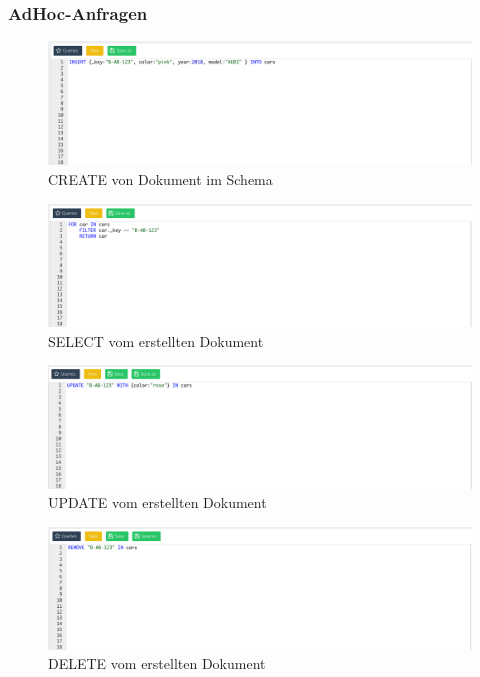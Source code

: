 \subsubsection{AdHoc-Anfragen}
\begin{figure}[htbp] 
  	\centering
     \includegraphics[width=1\textwidth]{./images/8.create.png}
 	\caption{CREATE von Dokument im Schema}
  \label{fig:DataSchema}
\end{figure}
\begin{figure}[htbp] 
  	\centering
     \includegraphics[width=1\textwidth]{./images/8.select.png}
 	\caption{SELECT vom erstellten Dokument}
  \label{fig:DataSchema}
\end{figure}
\begin{figure}[htbp] 
  	\centering
     \includegraphics[width=1\textwidth]{./images/8.update.png}
 	\caption{UPDATE vom erstellten Dokument}
  \label{fig:DataSchema}
\end{figure}
\begin{figure}[htbp] 
  	\centering
     \includegraphics[width=1\textwidth]{./images/8.delete.png}
 	\caption{DELETE vom erstellten Dokument}
  \label{fig:DataSchema}
\end{figure}